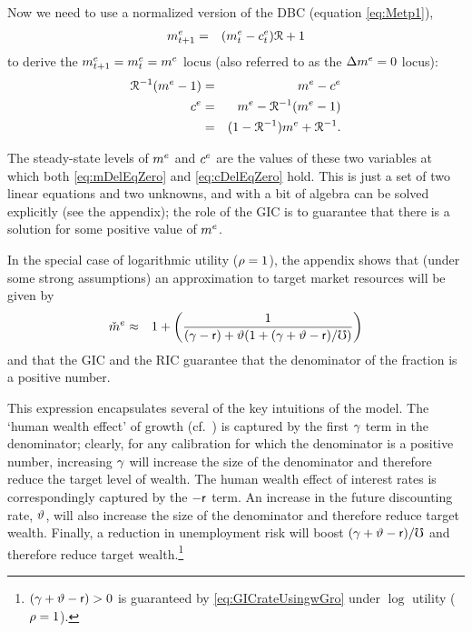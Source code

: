 \message{ !name(TractableBufferStock.tex)}\documentclass{handout}
\begin{document}
Now we need to use a normalized version of the DBC (equation \eqref{eq:Metp1}),
\begin{eqnarray}
        m^{e}_{t+1} & = & (m^{e}_{t}-c^{e}_{t})\mathcal{R}+1 \label{eq:metp1}
\end{eqnarray}
to derive the $\mRatE_{t+1}=\mRatE_{t}=\mRatE_{\tSS}$ locus (also referred
to as the $\Delta m^{e}=0$ locus): 
\begin{eqnarray}
      \Rnorm^{-1}(\mRatE_{\tSS}-1) & = & \mRatE_{\tSS}-\cRatE_{\tSS}
\\      \cRatE_{\tSS} & = & \mRatE_{\tSS}-\Rnorm^{-1}(\mRatE_{\tSS}-1)
\\       & = & (1-\Rnorm^{-1})\mRatE_{\tSS}+\Rnorm^{-1}. \label{eq:mDelEqZero}
\end{eqnarray}

The steady-state levels of $m^{e}$ and $c^{e}$ are the values of these two variables at which both
\eqref{eq:mDelEqZero} and \eqref{eq:cDelEqZero} hold.  This is
just a set of two linear equations and two unknowns, and with a bit of 
algebra can be solved explicitly (see the appendix); the role of the GIC 
is to guarantee that there is a solution for some positive value of $m^{e}$.

In the special case of logarithmic utility ($\rho = 1$), the
appendix shows that (under some strong assumptions) an approximation to target market resources will be given by
\begin{eqnarray}
 \check{m}^{e} & \approx & 1 + \left(\frac{1}{(\gamma-\mathsf{r})+\vartheta(1+(\gamma+\vartheta-\mathsf{r})/\mho)}\right) \label{eq:mTargetLogCase}
\end{eqnarray}
and that the GIC and the RIC guarantee that the denominator of the fraction is a positive number.

This expression encapsulates several of the key intuitions of the model.  The
`human wealth effect' of growth (cf.\ \cite{summersCapTax}) is captured by the first $\gamma$ term in the denominator;
clearly, for any calibration for which the denominator is a positive number, increasing
$\gamma$ will increase the size of the denominator and therefore reduce the target
level of wealth.  The human wealth effect of interest rates is  correspondingly captured
by the $-\mathsf{r}$ term.  An increase in the future discounting rate, $\vartheta$, will also
increase the size of the denominator and therefore reduce target wealth.  Finally,
a reduction in unemployment risk will boost $(\gamma+\vartheta-\mathsf{r})/\mho$ and therefore reduce target
wealth.\footnote{$(\gamma+\vartheta-\mathsf{r}) > 0$ is guaranteed by \eqref{eq:GICrateUsingwGro} under $\log$ utility ($\rho=1$).}
\end{document}
